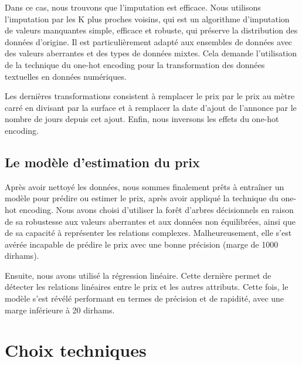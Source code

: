 \documentclass[a4paper,12pt]{report}
\numberwithin{equation}{section}
\begin{document}
Dans ce cas, nous trouvons que l’imputation est efficace. Nous utilisons l’imputation par les K plus proches voisins, qui est un algorithme d'imputation de valeurs manquantes simple, efficace et robuste, qui préserve la distribution des données d'origine. Il est particulièrement adapté aux ensembles de données avec des valeurs aberrantes et des types de données mixtes. Cela demande l’utilisation de la technique du one-hot encoding pour la transformation des données textuelles en données numériques.
\\ \par
Les dernières transformations consistent à remplacer le prix par le prix au mètre carré en divisant par la surface et à remplacer la date d’ajout de l’annonce par le nombre de jours depuis cet ajout. Enfin, nous inversons les effets du one-hot encoding.
\subsection{Le modèle d’estimation du prix}
\par
Après avoir nettoyé les données, nous sommes finalement prêts à entraîner un modèle pour prédire ou estimer le prix, après avoir appliqué la technique du one-hot encoding. Nous avons choisi d’utiliser la forêt d'arbres décisionnels en raison de sa robustesse aux valeurs aberrantes et aux données non équilibrées, ainsi que de sa capacité à représenter les relations complexes. Malheureusement, elle s'est avérée incapable de prédire le prix avec une bonne précision (marge de 1000 dirhams).
\\ \par
Ensuite, nous avons utilisé la régression linéaire. Cette dernière permet de détecter les relations linéaires entre le prix et les autres attributs. Cette fois, le modèle s'est révélé performant en termes de précision et de rapidité, avec une marge inférieure à 20 dirhams.
\newpage
\section{Choix techniques}
\end{document}

